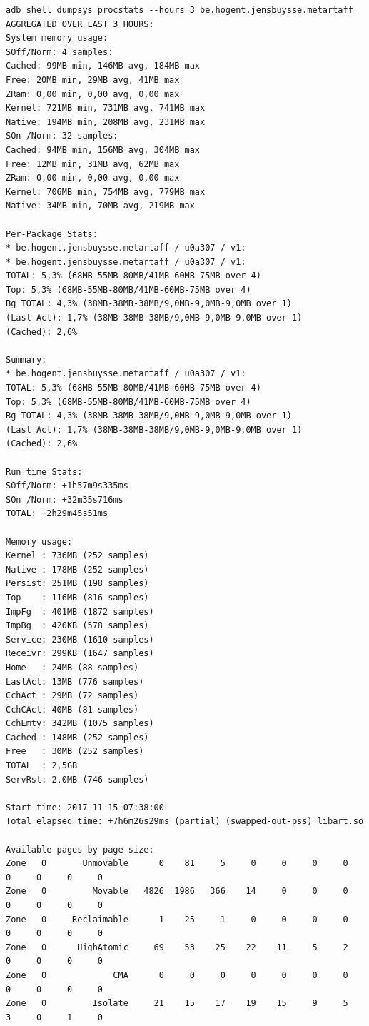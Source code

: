 \begin{verbatim}
adb shell dumpsys procstats --hours 3 be.hogent.jensbuysse.metartaff
AGGREGATED OVER LAST 3 HOURS:
System memory usage:
SOff/Norm: 4 samples:
Cached: 99MB min, 146MB avg, 184MB max
Free: 20MB min, 29MB avg, 41MB max
ZRam: 0,00 min, 0,00 avg, 0,00 max
Kernel: 721MB min, 731MB avg, 741MB max
Native: 194MB min, 208MB avg, 231MB max
SOn /Norm: 32 samples:
Cached: 94MB min, 156MB avg, 304MB max
Free: 12MB min, 31MB avg, 62MB max
ZRam: 0,00 min, 0,00 avg, 0,00 max
Kernel: 706MB min, 754MB avg, 779MB max
Native: 34MB min, 70MB avg, 219MB max

Per-Package Stats:
* be.hogent.jensbuysse.metartaff / u0a307 / v1:
* be.hogent.jensbuysse.metartaff / u0a307 / v1:
TOTAL: 5,3% (68MB-55MB-80MB/41MB-60MB-75MB over 4)
Top: 5,3% (68MB-55MB-80MB/41MB-60MB-75MB over 4)
Bg TOTAL: 4,3% (38MB-38MB-38MB/9,0MB-9,0MB-9,0MB over 1)
(Last Act): 1,7% (38MB-38MB-38MB/9,0MB-9,0MB-9,0MB over 1)
(Cached): 2,6%

Summary:
* be.hogent.jensbuysse.metartaff / u0a307 / v1:
TOTAL: 5,3% (68MB-55MB-80MB/41MB-60MB-75MB over 4)
Top: 5,3% (68MB-55MB-80MB/41MB-60MB-75MB over 4)
Bg TOTAL: 4,3% (38MB-38MB-38MB/9,0MB-9,0MB-9,0MB over 1)
(Last Act): 1,7% (38MB-38MB-38MB/9,0MB-9,0MB-9,0MB over 1)
(Cached): 2,6%

Run time Stats:
SOff/Norm: +1h57m9s335ms
SOn /Norm: +32m35s716ms
TOTAL: +2h29m45s51ms

Memory usage:
Kernel : 736MB (252 samples)
Native : 178MB (252 samples)
Persist: 251MB (198 samples)
Top    : 116MB (816 samples)
ImpFg  : 401MB (1872 samples)
ImpBg  : 420KB (578 samples)
Service: 230MB (1610 samples)
Receivr: 299KB (1647 samples)
Home   : 24MB (88 samples)
LastAct: 13MB (776 samples)
CchAct : 29MB (72 samples)
CchCAct: 40MB (81 samples)
CchEmty: 342MB (1075 samples)
Cached : 148MB (252 samples)
Free   : 30MB (252 samples)
TOTAL  : 2,5GB
ServRst: 2,0MB (746 samples)

Start time: 2017-11-15 07:38:00
Total elapsed time: +7h6m26s29ms (partial) (swapped-out-pss) libart.so

Available pages by page size:
Zone   0       Unmovable      0    81     5     0     0     0     0     0     0     0     0
Zone   0         Movable   4826  1986   366    14     0     0     0     0     0     0     0
Zone   0     Reclaimable      1    25     1     0     0     0     0     0     0     0     0
Zone   0      HighAtomic     69    53    25    22    11     5     2     0     0     0     0
Zone   0             CMA      0     0     0     0     0     0     0     0     0     0     0
Zone   0         Isolate     21    15    17    19    15     9     5     3     0     1     0

\end{verbatim}

